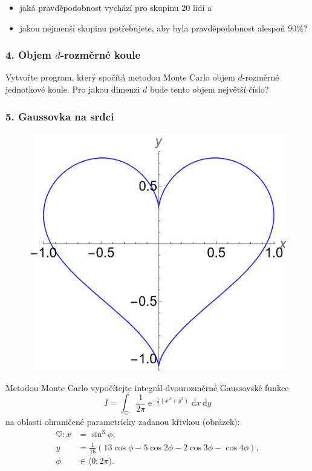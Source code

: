 \documentclass[a4paper,11pt,twoside]{article}
\DeclareMathOperator{\e}{e}
\renewcommand{\d}{\mathrm{d}}
\begin{document}
    \begin{itemize}
        \item jaká pravděpodobnost vychází pro skupinu 20 lidí a
        \item jakou nejmenší skupinu potřebujete, aby byla pravděpodobnost alespoň 90\%?
    \end{itemize}

\subsubsection*{4. Objem $d$-rozměrné koule}
    Vytvořte program, který spočítá metodou Monte Carlo objem $d$-rozměrné jednotkové koule.
    Pro jakou dimenzi $d$ bude tento objem největší číslo?

\subsubsection*{5. Gaussovka na srdci}
    \begin{figure}
        \centering
        \includegraphics[width=\linewidth]{heart.png}
    \end{figure}
    Metodou Monte Carlo vypočítejte integrál dvourozměrné Gaussovské funkce
    \begin{equation*}
        I=\int_{\heartsuit}\frac{1}{2\pi}\e^{-\frac{1}{2}\left(x^{2}+y^{2}\right)}\d x\,\d y
    \end{equation*}
    na oblasti ohraničené parametricky zadanou křivkou (obrázek):
    \begin{align*}
        \heartsuit: 
            x&=\sin^{3}{\phi},\\
            y&=\frac{1}{16}\left(13\cos{\phi}-5\cos{2\phi}-2\cos{3\phi}-\cos{4\phi}\right),\\
            \phi&\in\langle0;2\pi).
    \end{align*}
\end{document}
